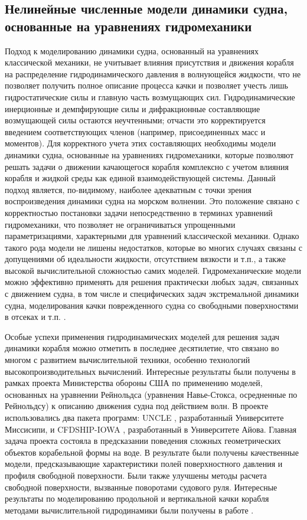 \subsection{Нелинейные численные модели динамики судна, основанные на уравнениях гидромеханики}
Подход к моделированию динамики судна, основанный на уравнениях классической механики, не учитывает влияния присутствия и движения корабля на распределение гидродинамического давления в волнующейся жидкости, что не позволяет получить полное описание процесса качки и позволяет учесть лишь гидростатические силы и главную часть возмущающих сил. Гидродинамические инерционные и демпфирующие силы и дифракционные составляющие возмущающей силы остаются неучтенными; отчасти это корректируется введением соответствующих  членов (например, присоединенных масс и моментов). Для корректного учета этих составляющих  необходимы модели динамики судна, основанные на уравнениях гидромеханики, которые позволяют решать задачи о движении качающегося корабля комплексно с учетом влияния корабля и жидкой среды как единой взаимодействующей системы. Данный подход является, по-видимому, наиболее адекватным с точки зрения воспроизведения динамики судна на морском волнении. Это положение связано с корректностью постановки задачи непосредственно в терминах уравнений гидромеханики, что позволяет не ограничиваться упрощенными параметризациями, характерными для уравнений классической механики. Однако такого рода модели не лишены недостатков, которые во многих случаях связаны с допущениями об идеальности жидкости, отсутствием вязкости и т.п., а также высокой вычислительной сложностью самих моделей. Гидромеханические модели можно эффективно применять для решения практически любых задач, связанных с движением судна, в том числе и специфических задач экстремальной динамики судна, моделирования качки поврежденного судна со свободными поверхностями в отсеках и т.п. \citep{dk33}\citep{dk34}.

Особые успехи применения гидродинамических моделей для решения задач динамики корабля можно отметить в последнее десятилетие, что связано во многом с развитием вычислительной техники, особенно технологий высокопроизводительных вычислений. Интересные результаты были получены в рамках проекта Министерства обороны США \citep{dk35} по применению моделей, основанных на уравнении Рейнольдса (уравнения Навье-Стокса, осредненные по Рейнольдсу) к описанию движения судна под действием волн. В проекте использовались два пакета программ: UNCLE \citep{dk36}, разработанный Университете Миссисипи, и CFDSHIP-IOWA \citep{dk37}, разработанный в Университете Айова. Главная задача проекта состояла в предсказании поведения сложных геометрических объектов корабельной формы на воде. В результате были получены качественные модели, предсказывающие характеристики полей поверхностного давления и профиля свободной поверхности. Были также улучшены методы расчета свободной поверхности, вызванные поворотами судового руля. Интересные результаты по моделированию продольной и вертикальной качки корабля методами вычислительной гидродинамики были получены в работе \citep{dk38}.

